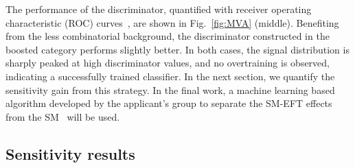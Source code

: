 \documentclass[a4paper,11pt]{article}
\begin{document}
The performance of the discriminator, quantified with receiver operating characteristic (ROC) curves~\cite{FAWCETT2006861}, are shown in Fig.~\ref{fig:MVA} (middle). 
Benefiting from the less combinatorial background,
the discriminator constructed in the boosted category performs slightly better. 
In both cases, the signal distribution is sharply peaked at high discriminator values, and no overtraining is observed, indicating a successfully trained classifier.
In the next section, we quantify the sensitivity gain from this strategy.
In the final work, a machine learning based algorithm developed by the applicant's group to separate the SM-EFT effects from the SM~\cite{Chatterjee:2021nms} will be used.

\subsection{Sensitivity results}
\end{document}
